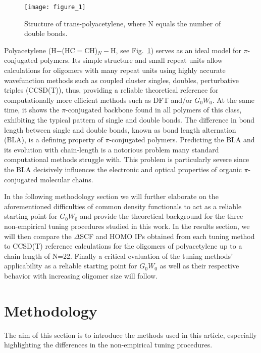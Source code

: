 \documentclass[journal=jctcce,manuscript=article,layout=twocolumn]{achemso}
\begin{document}
\begin{figure}[tbh]
\texttt{[image: figure\_1]}
\caption{Structure of trans-polyacetylene, where N equals the number of double bonds.\label{polyacetylene}}%
\end{figure}
Polyacetylene (H$-$(HC$=$CH)$_N-$H, see Fig.~\ref{polyacetylene}) serves as an ideal model for $\pi$-conjugated polymers. Its simple structure and small repeat units allow calculations for oligomers with many repeat units using highly accurate wavefunction methods such as coupled cluster singles, doubles, perturbative triples (CCSD(T)), thus, providing a reliable theoretical reference for computationally more efficient methods such as DFT and/or $G_0W_0$. At the same time, it shows the $\pi$-conjugated backbone found in all polymers of this class, exhibiting the typical pattern of single and double bonds. \cite{phys_rev_let_1979_solitons_polyene,jcp_1985_polyene_oligomers_geom_elec,jpc_a_2001_ex_tddft_polyene_oligomers} 
The difference in bond length between single and double bonds, known as bond length alternation (BLA), is a defining property of $\pi$-conjugated polymers. Predicting the BLA and its evolution with chain-length is a notorious problem many standard computational methods struggle with. \cite{jcp_1997_BLA_polyacetylene_dft,jpc_a_2006_BLA_hybrid_functionals,jctc_2011_dft_wavefun_benchmarks_BLA,jcp_2012_wPBE_PBEh_BLA_MESIE}
This problem is particularly severe since the BLA decisively influences the electronic and optical properties of organic $\pi$-conjugated molecular chains.

In the following methodology section we will further elaborate on the aforementioned difficulties of common density functionals to act as a reliable starting point for $G_0W_0$ and provide the theoretical background for the three non-empirical tuning procedures studied in this work.
In the results section, we will then compare the $\Delta$SCF and HOMO IPs 
obtained from each tuning method to CCSD(T) reference calculations for the oligomers of polyacetylene up to a chain length of N=22. 
Finally a critical evaluation of the tuning methods' applicability as a reliable starting point for $G_0W_0$ as well as their respective behavior with increasing oligomer size will follow.

\section{Methodology}
The aim of this section is to introduce the methods used in this article, especially highlighting the differences in the non-empirical tuning procedures.
\end{document}
